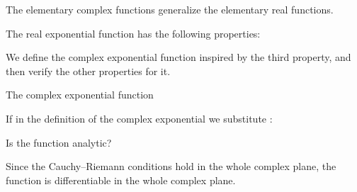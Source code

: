 The elementary complex functions generalize the elementary real functions.


The real exponential function  has the following properties:


We define the complex exponential function inspired by the third property, and then verify the other properties for it.

\begin{EMdefinition}{The complex exponential function}


\end{EMdefinition}

If in the definition of the complex exponential we substitute :


\begin{EMimportant}{}


\end{EMimportant}

\begin{EMexample}{}

Is the function  analytic?

Since the Cauchy--Riemann conditions hold in the whole complex plane, the function  is differentiable in the whole complex plane.

\end{EMexample}

